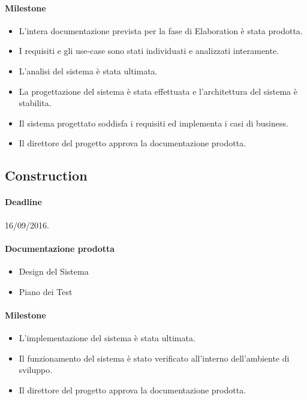 \paragraph{Milestone}
\begin{itemize}
	\item L'intera documentazione prevista per la fase di Elaboration \`e stata prodotta.
	\item I requisiti e gli use-case sono stati individuati e analizzati interamente.
	\item L'analisi del sistema \`e stata ultimata.
	\item La progettazione del sistema \`e stata effettuata e l'architettura del sistema \`e stabilita.
	\item Il sistema progettato soddisfa i requisiti ed implementa i casi di business.
	\item Il direttore del progetto approva la documentazione prodotta.
\end{itemize}

\subsection{Construction}

\paragraph{Deadline}
16/09/2016.

\paragraph{Documentazione prodotta}
\begin{itemize}
	\item Design del Sistema
	\item Piano dei Test
\end{itemize}

\paragraph{Milestone}
\begin{itemize}
	\item L'implementazione del sistema \`e stata ultimata.
	\item Il funzionamento del sistema \`e stato verificato all'interno dell'ambiente di sviluppo.
	\item Il direttore del progetto approva la documentazione prodotta.
\end{itemize}

